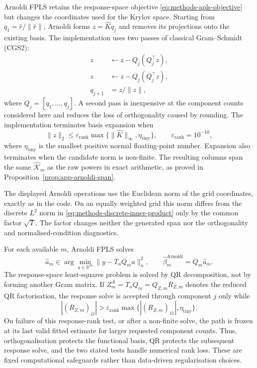 Arnoldi FPLS retains the response-space objective
\eqref{eq:methods-apls-objective} but changes the coordinates used for the
Krylov space.  Starting from
$q_1=\widehat r/\|\widehat r\|$, Arnoldi forms
$z=\widehat Kq_j$ and removes its projections onto the existing basis.  The
implementation uses two passes of classical Gram--Schmidt (CGS2):
\begin{align}
    z&\leftarrow z-Q_j(Q_j^\top z),
    \label{eq:methods-cgs-first-pass}\\
    z&\leftarrow z-Q_j(Q_j^\top z),
    \label{eq:methods-cgs-second-pass}\\
    q_{j+1}&=z/\|z\|,
    \label{eq:methods-arnoldi-normalise}
\end{align}
where $Q_j=[q_1,\ldots,q_j]$.  A second pass is inexpensive at the component
counts considered here and reduces the loss of orthogonality caused by
rounding.  The implementation terminates basis expansion when
\begin{equation}
    \|z\|_2\leq \varepsilon_{\mathrm{rank}}
                    \max\{\|\widehat K\|_\infty,\eta_{\mathrm{tiny}}\},
    \qquad \varepsilon_{\mathrm{rank}}=10^{-10},
    \label{eq:methods-arnoldi-rank-test}
\end{equation}
where $\eta_{\mathrm{tiny}}$ is the smallest positive normal floating-point
number.  Expansion also terminates when the candidate norm is non-finite.
The resulting columns span the same $\widehat{\mathcal K}_m$ as the raw
powers in exact arithmetic, as proved in
Proposition~\ref{prop:app-arnoldi-span}.

The displayed Arnoldi operations use the Euclidean norm of the grid
coordinates, exactly as in the code.  On an equally weighted grid this norm
differs from the discrete $L^2$ norm in
\eqref{eq:methods-discrete-inner-product} only by the common factor
$\sqrt T$.  The factor changes neither the generated span nor the
orthogonality and normalised-condition diagnostics.

For each available $m$, Arnoldi FPLS solves
\begin{equation}
    \widehat a_m
    \in\arg\min_{a\in\mathbb R^m}\|y-T_nQ_ma\|_n^2,
    \qquad
    \widehat\beta_m^{\mathrm{Arnoldi}}=Q_m\widehat a_m.
    \label{eq:methods-arnoldi-objective}
\end{equation}
The response-space least-squares problem is solved by QR decomposition,
not by forming another Gram matrix.  If
$Z_m^{A}=T_nQ_m=Q_{Z,m}R_{Z,m}$ denotes the reduced QR factorisation, the
response solve is accepted through component $j$ only while
\begin{equation}
    |(R_{Z,m})_{jj}|
    >\varepsilon_{\mathrm{rank}}
      \max\{|(R_{Z,m})_{11}|,\eta_{\mathrm{tiny}}\}.
    \label{eq:methods-arnoldi-response-rank-test}
\end{equation}
On failure of this response-rank test, or after a non-finite solve, the path
is frozen at its last valid fitted estimate for larger requested component
counts.  Thus, orthogonalisation protects the functional basis, QR protects
the subsequent response solve, and the two stated tests handle numerical
rank loss.  These are fixed computational safeguards rather than
data-driven regularisation choices.

